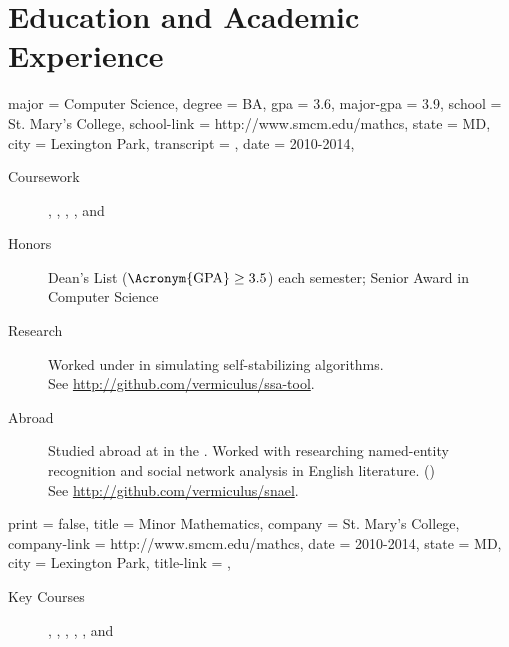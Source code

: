 \documentclass{simplecv}
\begin{document}
\section{Education and Academic Experience}
\begin{education}
  {
    major = Computer Science,
    degree = BA,
    gpa = 3.6,
    major-gpa = 3.9,
    school = St. Mary's College,
    school-link = http://www.smcm.edu/mathcs,
    state = MD,
    city = Lexington Park,
    transcript = \transcript,
    date = 2010-2014,
  }

\begin{description}
\item[Coursework]
  ,
  ,
  ,
  ,
  and
\item[Honors] Dean's List ($\text{\Acronym{GPA}} \geq 3.5$) each semester;
  Senior Award in Computer Science
\item[Research] Worked under  in simulating
  self-stabilizing algorithms.
  \\
  See \url{http://github.com/vermiculus/ssa-tool}.
\item[Abroad] Studied abroad at \href{http://www.ucd.ie}{} in the .
  Worked with  researching named-entity recognition and social network
  analysis in English literature. ()
  \\
  See \url{http://github.com/vermiculus/snael}.
\end{description}
\end{education}

\begin{position}
  {
    print   = false,
    title   = Minor \Dash Mathematics,
    company = St. Mary's College,
    company-link = http://www.smcm.edu/mathcs,
    date    = 2010-2014,
    state   = MD,
    city    = Lexington Park,
    title-link = \transcript,
  }

  \begin{description}
  \item[Key Courses]
    ,
    ,
    ,
    ,
    ,
    and
  \end{description}
\end{position}
\end{document}
